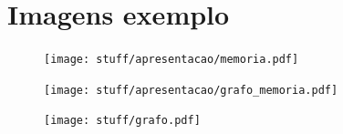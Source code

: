 \documentclass[11pt,a4paper]{article}
\begin{document}
\pagebreak
\appendix
\section{Imagens exemplo}
\begin{figure}[!ht]
    \centering
        \texttt{[image: stuff/apresentacao/memoria.pdf]}
\end{figure}

\begin{figure}[!ht]
    \centering
        \texttt{[image: stuff/apresentacao/grafo\_memoria.pdf]}
\end{figure}

\begin{figure}[!ht]
    \centering
        \texttt{[image: stuff/grafo.pdf]}
\end{figure}
\end{document}
